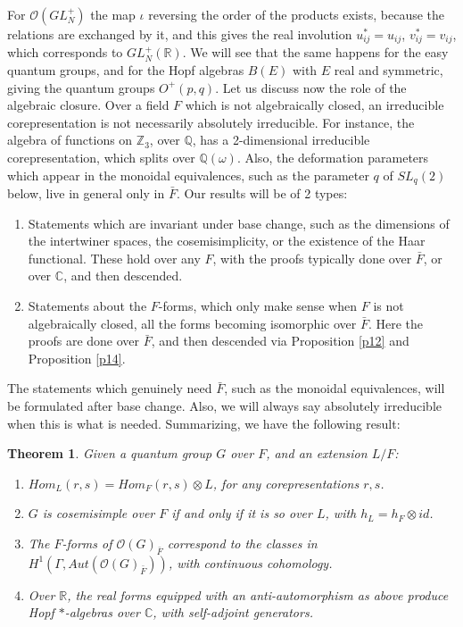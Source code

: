\documentclass[11pt]{amsart}
\newtheorem{theorem}{Theorem}[section]
\theoremstyle{definition}
\begin{document}
For $\mathcal O(GL_N^+)$ the map $\iota$ reversing the order of the products exists, because the relations are exchanged by it, and this gives the real involution $u_{ij}^*=u_{ij}$, $v_{ij}^*=v_{ij}$, which corresponds to $GL_N^+(\mathbb R)$. We will see that the same happens for the easy quantum groups, and for the Hopf algebras $B(E)$ with $E$ real and symmetric, giving the quantum groups $O^+(p,q)$. Let us discuss now the role of the algebraic closure. Over a field $F$ which is not algebraically closed, an irreducible corepresentation is not necessarily absolutely irreducible. For instance, the algebra of functions on $\mathbb Z_3$, over $\mathbb Q$, has a 2-dimensional irreducible corepresentation, which splits over $\mathbb Q(\omega)$. Also, the deformation parameters which appear in the monoidal equivalences, such as the parameter $q$ of $SL_q(2)$ below, live in general only in $\bar F$. Our results will be of 2 types:
\begin{enumerate}
\item Statements which are invariant under base change, such as the dimensions of the intertwiner spaces, the cosemisimplicity, or the existence of the Haar functional. These hold over any $F$, with the proofs typically done over $\bar F$, or over $\mathbb C$, and then descended.

\item Statements about the $F$-forms, which only make sense when $F$ is not algebraically closed, all the forms becoming isomorphic over $\bar F$. Here the proofs are done over $\bar F$, and then descended via Proposition \ref{p12} and Proposition \ref{p14}.
\end{enumerate}

The statements which genuinely need $\bar F$, such as the monoidal equivalences, will be formulated after base change. Also, we will always say absolutely irreducible when this is what is needed. Summarizing, we have the following result:

\begin{theorem}
\label{t16}
Given a quantum group $G$ over $F$, and an extension $L/F$:
\begin{enumerate}
\item $Hom_L(r,s)=Hom_F(r,s)\otimes L$, for any corepresentations $r,s$.

\item $G$ is cosemisimple over $F$ if and only if it is so over $L$, with $h_L=h_F\otimes id$.

\item The $F$-forms of $\mathcal O(G)_{\bar F}$ correspond to the classes in $H^1(\Gamma,Aut(\mathcal O(G)_{\bar F}))$, with continuous cohomology.

\item Over $\mathbb R$, the real forms equipped with an anti-automorphism as above produce Hopf $*$-algebras over $\mathbb C$, with self-adjoint generators.
\end{enumerate}
\end{theorem}
\end{document}
